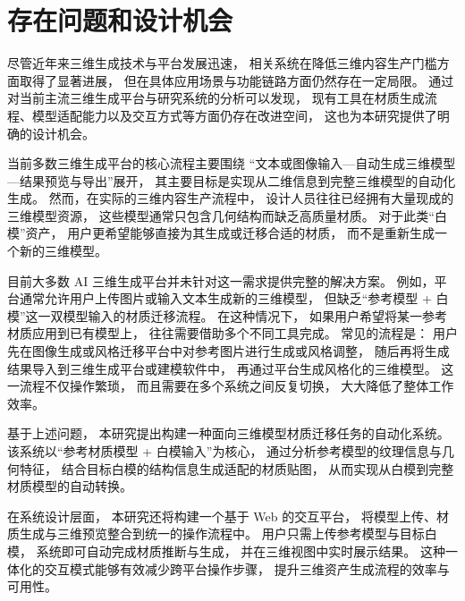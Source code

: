 \section{存在问题和设计机会}

尽管近年来三维生成技术与平台发展迅速，
相关系统在降低三维内容生产门槛方面取得了显著进展，
但在具体应用场景与功能链路方面仍然存在一定局限。
通过对当前主流三维生成平台与研究系统的分析可以发现，
现有工具在材质生成流程、模型适配能力以及交互方式等方面仍存在改进空间，
这也为本研究提供了明确的设计机会。

当前多数三维生成平台的核心流程主要围绕
“文本或图像输入—自动生成三维模型—结果预览与导出”展开，
其主要目标是实现从二维信息到完整三维模型的自动化生成。
然而，在实际的三维内容生产流程中，
设计人员往往已经拥有大量现成的三维模型资源，
这些模型通常只包含几何结构而缺乏高质量材质。
对于此类“白模”资产，
用户更希望能够直接为其生成或迁移合适的材质，
而不是重新生成一个新的三维模型。

目前大多数 AI 三维生成平台并未针对这一需求提供完整的解决方案。
例如，平台通常允许用户上传图片或输入文本生成新的三维模型，
但缺乏“参考模型 + 白模”这一双模型输入的材质迁移流程。
在这种情况下，
如果用户希望将某一参考材质应用到已有模型上，
往往需要借助多个不同工具完成。
常见的流程是：
用户先在图像生成或风格迁移平台中对参考图片进行生成或风格调整，
随后再将生成结果导入到三维生成平台或建模软件中，
再通过平台生成风格化的三维模型。
这一流程不仅操作繁琐，
而且需要在多个系统之间反复切换，
大大降低了整体工作效率。

基于上述问题，
本研究提出构建一种面向三维模型材质迁移任务的自动化系统。
该系统以“参考材质模型 + 白模输入”为核心，
通过分析参考模型的纹理信息与几何特征，
结合目标白模的结构信息生成适配的材质贴图，
从而实现从白模到完整材质模型的自动转换。

在系统设计层面，
本研究还将构建一个基于 Web 的交互平台，
将模型上传、材质生成与三维预览整合到统一的操作流程中。
用户只需上传参考模型与目标白模，
系统即可自动完成材质推断与生成，
并在三维视图中实时展示结果。
这种一体化的交互模式能够有效减少跨平台操作步骤，
提升三维资产生成流程的效率与可用性。